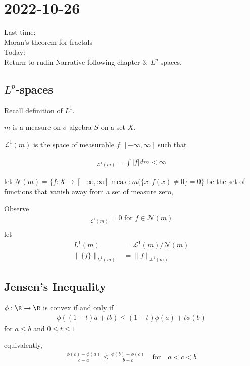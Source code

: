 \section{2022-10-26}

\noindent
Last time: \\
Moran's theorem for fractals \\

\noindent
Today: \\
Return to rudin Narrative following chapter $3$: $L^{p}$-spaces.

\subsection{$L^{p}$-spaces}

Recall definition of $L^{1}$.

$m$ is a measure on $\sigma$-algebra $S$ on a set $X$.

$\mathcal{L}^{1}(m)$ is the space of measurable $f : [-\infty, \infty]$ such that

\begin{align*}
	[f]_{\mathcal{L}^{1}(m)} = \int |f| dm < \infty
\end{align*}

let $\mathcal{N}(m) = \{f : X \to [-\infty, \infty] \text{ meas }: m(\{x : f(x) \neq 0\} = 0\}$ be the set of functions that vanish away from a set of measure zero,

Observe
\begin{align*}
	[f]_{\mathcal{L}^1 (m) } = 0 \text{ for } f \in \mathcal{N}(m) \\
\end{align*} let
 \begin{align*}
	 L^{1} (m) &= \mathcal{L}^1 (m) / \mathcal{N} (m) \\
	 \|\{f\}\|_{L^1 (m) } &= \|f\|_{\mathcal{L}^1 (m) } 
\end{align*} 


\subsection{ Jensen's Inequality }
	
\begin{definition}[Convex]
	$\phi : \R \to \R$ is convex if and only if
	\begin{align*}
		\phi (( 1 - t) a + tb) \leq (1-t) \phi (a) + t \phi (b)
	\end{align*} for $a \leq b$ and $0 \leq t \leq 1$

	equivalently, 
	\begin{align*}
		\frac{\phi (c) - \phi (a)}{c - a} \leq \frac{\phi (b) - \phi (c)}{b - c} 
		\quad \text{for} \quad  a < c < b
	\end{align*} 
\end{definition}
	
